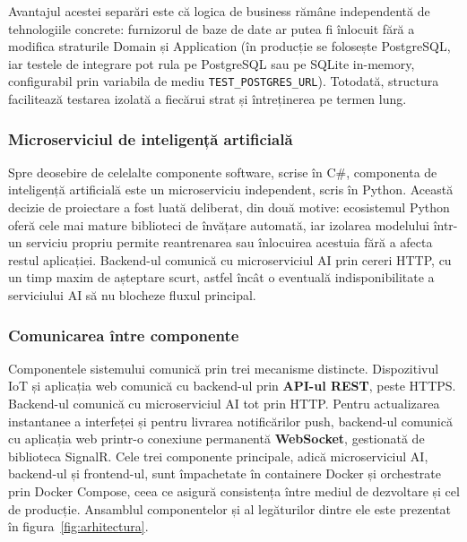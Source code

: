 \documentclass[12pt,a4paper,twoside]{article}
\begin{document}
Avantajul acestei separări este că logica de business rămâne independentă de tehnologiile concrete: furnizorul de baze de date ar putea fi înlocuit fără a modifica straturile Domain și Application (în producție se folosește PostgreSQL, iar testele de integrare pot rula pe PostgreSQL sau pe SQLite in-memory, configurabil prin variabila de mediu \texttt{TEST\_POSTGRES\_URL}). Totodată, structura facilitează testarea izolată a fiecărui strat și întreținerea pe termen lung.

\subsubsection{Microserviciul de inteligență artificială}

Spre deosebire de celelalte componente software, scrise în C\#, componenta de inteligență artificială este un microserviciu independent, scris în Python. Această decizie de proiectare a fost luată deliberat, din două motive: ecosistemul Python oferă cele mai mature biblioteci de învățare automată, iar izolarea modelului într-un serviciu propriu permite reantrenarea sau înlocuirea acestuia fără a afecta restul aplicației. Backend-ul comunică cu microserviciul AI prin cereri HTTP, cu un timp maxim de așteptare scurt, astfel încât o eventuală indisponibilitate a serviciului AI să nu blocheze fluxul principal.

\subsubsection{Comunicarea între componente}

Componentele sistemului comunică prin trei mecanisme distincte. Dispozitivul IoT și aplicația web comunică cu backend-ul prin \textbf{API-ul REST}, peste HTTPS. Backend-ul comunică cu microserviciul AI tot prin HTTP. Pentru actualizarea instantanee a interfeței și pentru livrarea notificărilor push, backend-ul comunică cu aplicația web printr-o conexiune permanentă \textbf{WebSocket}, gestionată de biblioteca SignalR. Cele trei componente principale, adică microserviciul AI, backend-ul și frontend-ul, sunt împachetate în containere Docker și orchestrate prin Docker Compose, ceea ce asigură consistența între mediul de dezvoltare și cel de producție. Ansamblul componentelor și al legăturilor dintre ele este prezentat în figura~\ref{fig:arhitectura}.
\end{document}
